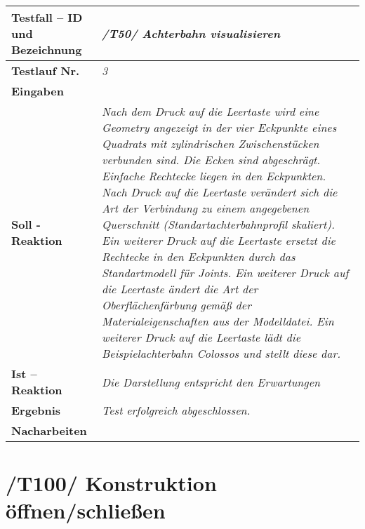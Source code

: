 \begin{longtable}{|p{7cm}|p{10cm}|}
\hline
\textbf{Testfall -- ID und Bezeichnung} & \textit{ /T50/ Achterbahn visualisieren} \\
\hline
\textbf{Testlauf Nr.} & \textit{3} \\
\hline
\textbf{Eingaben} & \textit{} \\
\hline
\textbf{Soll - Reaktion} & \textit{Nach dem Druck auf die Leertaste wird eine Geometry angezeigt in der vier Eckpunkte eines Quadrats mit zylindrischen Zwischenstücken verbunden sind. Die Ecken sind abgeschrägt. Einfache Rechtecke liegen in den Eckpunkten.
Nach Druck auf die Leertaste verändert sich die Art der Verbindung zu einem angegebenen Querschnitt (Standartachterbahnprofil skaliert). Ein weiterer Druck auf die Leertaste ersetzt die Rechtecke in den Eckpunkten durch 
das Standartmodell für Joints. Ein weiterer Druck auf die Leertaste ändert die Art der Oberflächenfärbung gemäß der Materialeigenschaften aus der Modelldatei. Ein weiterer Druck auf die Leertaste lädt die Beispielachterbahn Colossos und stellt diese dar.
} \\
\hline
\textbf{Ist -- Reaktion} & \textit{Die Darstellung entspricht den Erwartungen} \\
\hline
\textbf{Ergebnis} & \textit{Test erfolgreich abgeschlossen.} \\
\hline
\textbf{Nacharbeiten } & \textit{} \\
\hline
 \end{longtable}
 
 \section{/T100/ Konstruktion öffnen/schließen}

